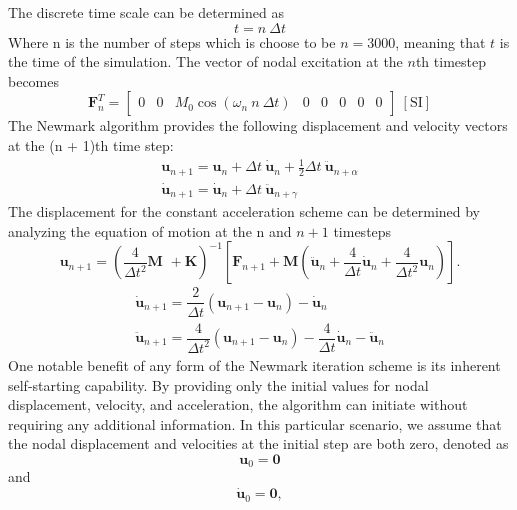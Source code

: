 \documentclass[12pt]{article}
\begin{document}
The discrete time scale can be determined as
\begin{equation}
t = n ~ \Delta t
\end{equation}
Where n is the number of steps which is choose to be $n = 3000$, meaning that $t$ is the time of the simulation. The vector of nodal excitation at the $n$th timestep becomes
\begin{equation}
\textbf{F}_n^T = \begin{bmatrix}
0 & 0 & M_0 \cos \left( \omega_n ~n ~ \Delta t \right) & 0 & 0 & 0 & 0 & 0
\end{bmatrix} ~ [\text{SI}]
\end{equation}
The Newmark algorithm provides the following displacement and velocity vectors at the (n + 1)th time step:
\begin{gather}
\textbf{u}_{n+1} = \textbf{u}_n + \Delta t ~ \dot{\textbf{u}}_n + \frac{1}{2} \Delta t ~ \ddot{\textbf{u}}_{n+\alpha} \\
\dot{\textbf{u}}_{n+1} = \dot{\textbf{u}}_n+ \Delta t ~ \ddot{\textbf{u}}_{n+ \gamma}
\end{gather}
The displacement for the constant acceleration scheme can be determined by analyzing the equation of motion at the n and $n+1$ timesteps
\begin{equation}
\textbf{u}_{n+1} = \left( \dfrac{4}{\Delta t^2} \textbf{M }+ \textbf{K} \right) ^{-1} \left[ \textbf{F}_{n+1} + \textbf{M} \left( \ddot{\textbf{u}}_n + \dfrac{4}{\Delta t} \dot{\textbf{u}}_n + \dfrac{4}{\Delta t^2} \textbf{u}_n \right) \right].
\end{equation}
\begin{gather}
\dot{\textbf{u}}_{n+1} = \dfrac{2}{\Delta t} \left( \textbf{u}_{n+1} - \textbf{u}_n\right) - \dot{\textbf{u}}_n \\
\ddot{\textbf{u}}_{n+1} = \dfrac{4}{\Delta t^2} \left( \textbf{u}_{n+1}- \textbf{u}_n \right) - \dfrac{4}{\Delta t} \dot{\textbf{u}}_n- \ddot{\textbf{u}}_n
\end{gather}
One notable benefit of any form of the Newmark iteration scheme is its inherent self-starting capability. By providing only the initial values for nodal displacement, velocity, and acceleration, the algorithm can initiate without requiring any additional information. In this particular scenario, we assume that the nodal displacement and velocities at the initial step are both zero, denoted as
\begin{equation}
\textbf{u}_0 = \textbf{0}
\end{equation}
and
\begin{equation}
\dot{\textbf{u}}_0 = \textbf{0},
\end{equation}
\end{document}
